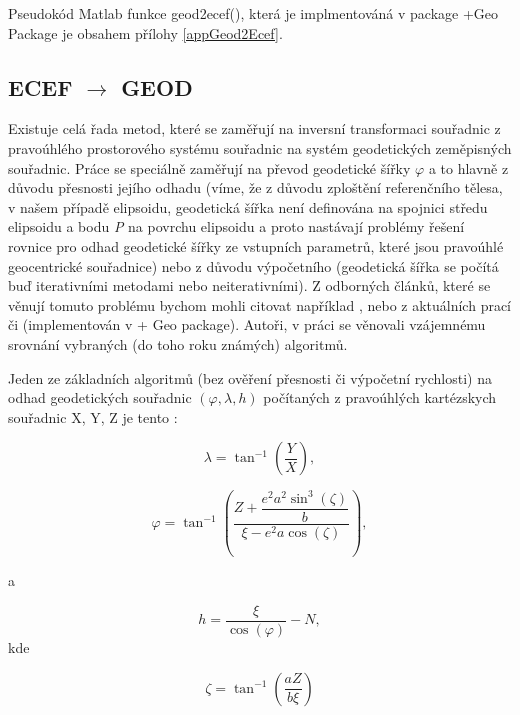 \documentclass[11pt,a4paper]{article}
\begin{document}
Pseudokód Matlab funkce geod2ecef(), která je implmentováná v package +Geo Package je obsahem přílohy \ref{appGeod2Ecef}.


\subsection{ECEF $\rightarrow$ GEOD}

Existuje celá řada metod, které se zaměřují na inversní transformaci souřadnic z pravoúhlého prostorového systému souřadnic na systém geodetických zeměpisných souřadnic. Práce se speciálně zaměřují na převod geodetické šířky $\varphi$ a to hlavně z důvodu přesnosti jejího odhadu (víme, že z důvodu zploštění referenčního tělesa, v našem případě elipsoidu, geodetická šířka není definována na spojnici středu elipsoidu a bodu \textit{P} na povrchu elipsoidu a proto nastávají problémy řešení rovnice pro odhad geodetické šířky ze vstupních parametrů, které jsou pravoúhlé geocentrické souřadnice) nebo z důvodu výpočetního (geodetická šířka se počítá buď iterativními metodami nebo neiterativními). Z odborných článků, které se věnují tomuto problému bychom mohli citovat například \cite{Bowring1976}, \cite{Borkowski1989} nebo z aktuálních prací \cite{Fukushima2006} či \cite{Vermeille2011} (implementován v + Geo package). Autoři, v práci \cite{Fok2003} se věnovali vzájemnému srovnání vybraných (do toho roku známých) algoritmů.

Jeden ze základních algoritmů (bez ověření přesnosti či výpočetní rychlosti) na odhad geodetických souřadnic $ \left(\varphi, \lambda, h \right)$ počítaných z pravoúhlých kartézskych souřadnic X, Y, Z je tento \cite{Grewal2001}:


\begin{equation}
\lambda = \tan^{-1}{\left(\dfrac{Y}{X}\right)},
\end{equation} 

\begin{equation}
\varphi = \tan^{-1}{\left(\dfrac{Z+\dfrac{e^{2}a^{2}\sin^{3}{\left(\zeta\right)}}{b}}{\xi-e^{2}a\cos{\left(\zeta\right)}}\right)},
\end{equation} 

a

\begin{equation}
h = \dfrac{\xi}{\cos{\left(\varphi\right)}} - N,
\end{equation}
kde

\begin{equation}
\zeta = \tan^{-1}{\left(\dfrac{aZ}{b\xi}\right)}
\end{equation}
\end{document}
